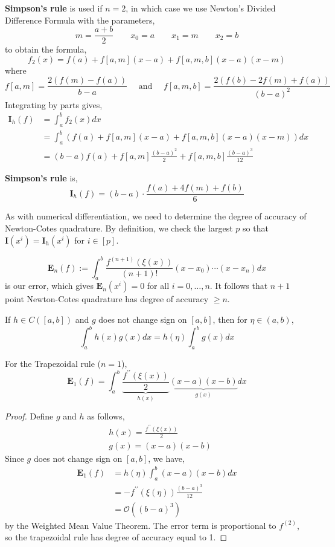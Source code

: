 \NewLine

\textbf{Simpson's rule} is used if $n = 2$, in which case we use Newton's Divided Difference Formula with the parameters,
\[m = \frac{a+b}{2} \quad\quad x_0 = a \quad\quad x_1 = m \quad\quad x_2 = b\]
to obtain the formula,
\[f_2(x)=f(a)+f[a, m](x-a)+f[a, m, b](x-a)(x-m)\]
where
\[f[a, m]=\frac{2(f(m)-f(a))}{b-a} \quad \text{ and } \quad f[a, m, b]=\frac{2(f(b)-2 f(m)+f(a))}{(b-a)^2}\]
Integrating by parts gives,
\begin{align*}
	\mathbf{I}_h(f) &= \int_a^b f_2(x) d x \\
			 		&= \int_a^b(f(a)+f[a, m](x-a)+f[a, m, b](x-a)(x-m)) d x \\
			 		&= (b-a) f(a)+f[a, m] \frac{(b-a)^2}{2}+f[a, m, b] \frac{(b-a)^3}{12}
\end{align*}
	
\begin{defn}
	\textbf{Simpson's rule} is,
	\[\mathbf{I}_h(f)=(b-a) \cdot \frac{f(a)+4 f(m)+f(b)}{6}\]
\end{defn}

\NewLine

As with numerical differentiation, we need to determine the degree of accuracy of Newton-Cotes quadrature. By definition, we check the largest $p$ so that $\mathbf{I}(x^i) = \mathbf{I}_h(x^i)$ for $i \in [p]$.

\[\mathbf{E}_n(f) := \int_a^b \frac{f^{(n+1)}(\xi(x))}{(n+1) !}\left(x-x_0\right) \cdots\left(x-x_n\right) d x\]
is our error, which gives $\mathbf{E}_n\left(x^i\right)=0 $ for all $i=0, \ldots, n$. It follows that $n + 1$ point Newton-Cotes quadrature has degree of accuracy $\geq n$.


\begin{lem}
	If $h \in C([a, b])$ and $g$ does not change sign on $[a,b]$, then for $\eta \in(a, b)$,
	\[\int_a^b h(x) g(x) d x=h(\eta) \int_a^b g(x) d x\]
\end{lem}

\begin{prop}
	For the Trapezoidal rule ($n = 1$),
	\[\mathbf{E}_1(f)=\int_a^b \underbrace{\frac{f^{\prime \prime}(\xi(x))}{2}}_{h(x)} \underbrace{(x-a)(x-b)}_{g(x)} d x\]
\end{prop}

\begin{proof}
	Define $g$ and $h$ as follows,
	\begin{align*}
		&h(x) = \frac{f^{\prime \prime}(\xi(x))}{2} \\
		&g(x) = (x-a)(x-b)
	\end{align*}
	Since $g$ does not change sign on $[a,b]$, we have,
	\begin{align*}
		\mathbf{E}_1(f)&=h(\eta) \int_a^b(x-a)(x-b) d x \\
			  &=-f^{\prime \prime}(\xi(\eta)) \frac{(b-a)^3}{12}\\
			  &=\mathcal{O}\left((b-a)^3\right)
	\end{align*}
	by the Weighted Mean Value Theorem. The error term is proportional to $f^{(2)}$, so the trapezoidal rule has degree of accuracy equal to 1.
\end{proof}

